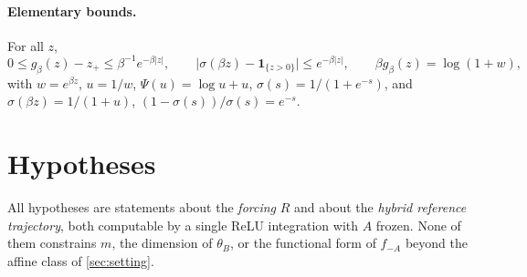 \documentclass[11pt]{article}
\theoremstyle{definition}
\theoremstyle{remark}
\begin{document}
\paragraph{Elementary bounds.} For all $z$,
\begin{equation}\label{eq:softdefect}
0\le g_\beta(z)-z_+\le\beta^{-1}e^{-\beta|z|},
\qquad
\bigl|\sigma(\beta z)-\mathbf 1_{\{z>0\}}\bigr|\le e^{-\beta|z|},
\qquad
\beta g_\beta(z)=\log(1+w),
\end{equation}
with $w=e^{\beta z}$, $u=1/w$, $\Psi(u)=\log u+u$, $\sigma(s)=1/(1+e^{-s})$, and
$\sigma(\beta z)=1/(1+u)$, $(1-\sigma(s))/\sigma(s)=e^{-s}$.

\section{Hypotheses}\label{sec:hyp}

All hypotheses are statements about the \emph{forcing} $R$ and about the
\emph{hybrid reference trajectory}, both computable by a single ReLU integration
with $A$ frozen. None of them constrains $m$, the dimension of $\theta_B$, or the
functional form of $f_{-A}$ beyond the affine class of \cref{sec:setting}.
\end{document}
